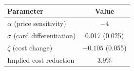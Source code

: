\begin{tabular}{lc}
\toprule
Parameter & Value \\
\midrule
$\alpha$ (price sensitivity) & $-4$ \\
$\sigma$ (card differentiation) & 0.017 (0.025) \\
$\zeta$ (cost change) & $-0.105$ (0.055) \\
\midrule
Implied cost reduction & 3.9\% \\
\bottomrule
\end{tabular}
